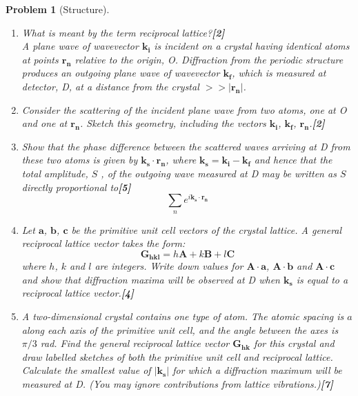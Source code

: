 \documentclass[a4paper]{article}
\theoremstyle{new}
\newtheorem{qns}{Problem}[subsection]
\begin{document}
\newpage
\begin{qns}[Structure]\leavevmode
\begin{enumerate}[label=(\roman*)]
\item What is meant by the term reciprocal lattice?\hfill\textbf{[2]}\\[5pt]
A plane wave of wavevector $\mathbf{k_i}$ is incident on a crystal having identical atoms at points $\mathbf{r_n}$ relative to the origin, O. Diffraction from the periodic structure produces an outgoing plane wave of wavevector $\mathbf{k_f}$, which is measured at detector, D, at a distance from the crystal $>>|\mathbf{r_n}|$.
\item Consider the scattering of the incident plane wave from two atoms, one at O and one at $\mathbf{r_n}$. Sketch this geometry, including the vectors $\mathbf{k_i}$, $\mathbf{k_f}$, $\mathbf{r_n}$.\hfill\textbf{[2]}
\item Show that the phase difference between the scattered waves arriving at D from these two atoms is given by $\mathbf{k_s}\cdot\mathbf{r_n}$, where $\mathbf{k_s}=\mathbf{k_i}-\mathbf{k_f}$ and hence that the total amplitude, $S$ , of the outgoing wave measured at D may be written as $S$ directly proportional to\hfill\textbf{[5]}
$$\sum_ne^{i\mathbf{k_s}\cdot\mathbf{r_n}}$$
\item Let $\mathbf{a}$, $\mathbf{b}$, $\mathbf{c}$ be the primitive unit cell vectors of the crystal lattice. A general reciprocal lattice vector takes the form:
$$\mathbf{G_{hkl}}=h\mathbf{A}+k\mathbf{B}+l\mathbf{C}$$
where $h$, $k$ and $l$ are integers. Write down values for $\mathbf{A}\cdot\mathbf{a}$, $\mathbf{A}\cdot\mathbf{b}$ and $\mathbf{A}\cdot\mathbf{c}$ and show that diffraction maxima will be observed at D when $\mathbf{k_s}$ is equal to a reciprocal lattice vector.\hfill\textbf{[4]}
\item A two-dimensional crystal contains one type of atom. The atomic spacing is $a$ along each axis of the primitive unit cell, and the angle between the axes is $\pi/3$ rad. Find the general reciprocal lattice vector $\mathbf{G_{hk}}$ for this crystal and draw labelled sketches of both the primitive unit cell and reciprocal lattice. Calculate the smallest value of $|\mathbf{k_s}|$ for which a diffraction maximum will be measured at D. (You may ignore contributions from lattice vibrations.)\hfill\textbf{[7]}
\end{enumerate}
\end{qns}
\end{document}
